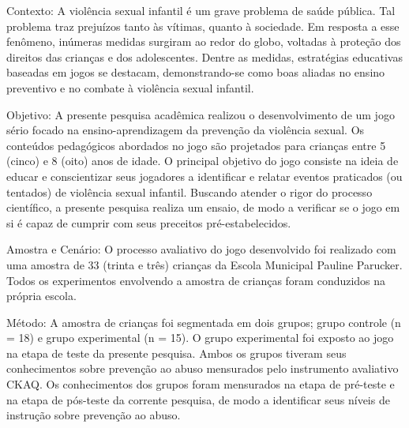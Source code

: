 
\setlength{\absparsep}{8pt} %
\begin{resumo}
  Contexto: A violência sexual infantil é um grave problema de saúde pública. Tal problema traz prejuízos tanto às vítimas, quanto à sociedade. Em resposta a esse fenômeno, inúmeras medidas surgiram ao redor do globo, voltadas à proteção dos direitos das crianças e dos adolescentes. Dentre as medidas, estratégias educativas baseadas em jogos se destacam, demonstrando-se como boas aliadas no ensino preventivo e no combate à violência sexual infantil.

  Objetivo: A presente pesquisa acadêmica realizou o desenvolvimento de um jogo sério focado na ensino-aprendizagem da prevenção da violência sexual. Os conteúdos pedagógicos abordados no jogo são projetados para crianças entre 5 (cinco) e 8 (oito) anos de idade. O principal objetivo do jogo consiste na ideia de educar e conscientizar seus jogadores a identificar e relatar eventos praticados (ou tentados) de violência sexual infantil. Buscando atender o rigor do processo científico, a presente pesquisa realiza um ensaio, de modo a verificar se o jogo em si é capaz de cumprir com seus preceitos pré-estabelecidos.

  Amostra e Cenário: O processo avaliativo do jogo desenvolvido foi realizado com uma amostra de 33 (trinta e três) crianças da Escola Municipal Pauline Parucker. Todos os experimentos envolvendo a amostra de crianças foram conduzidos na própria escola.%

  Método: A amostra de crianças foi segmentada em dois grupos; grupo controle (n = 18) e grupo experimental (n = 15). O grupo experimental foi exposto ao jogo na etapa de teste da presente pesquisa. Ambos os grupos tiveram seus conhecimentos sobre prevenção ao abuso mensurados pelo instrumento avaliativo \ac{CKAQ}. Os conhecimentos dos grupos foram mensurados na etapa de pré-teste e na etapa de pós-teste da corrente pesquisa, de modo a identificar seus níveis de instrução sobre prevenção ao abuso. 


\end{resumo}
